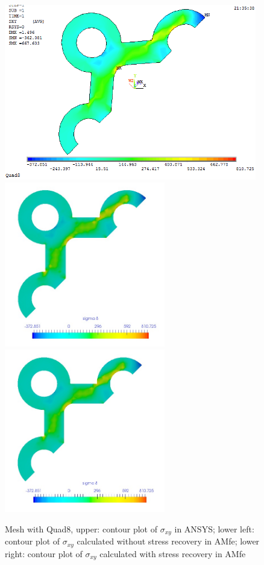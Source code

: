 \begin{figure}[htbp]
	\begin{center}
		\includegraphics[width=11cm,clip]{Quad8_Sxy.png} 
		\includegraphics[width=7cm,clip]{Quad8_Sxy_PD.png} 		
		\includegraphics[width=7cm,clip]{Quad8_Sxy_P.png} 		
		\caption{Mesh with Quad8, upper: contour plot of $\sigma_{xy}$ in ANSYS; lower left: contour plot of $\sigma_{xy}$ calculated without stress recovery in AMfe; lower right: contour plot of $\sigma_{xy}$ calculated with stress recovery in AMfe} \label{fig: Quad8_Sxy}
	\end{center}
\end{figure}
\clearpage 

